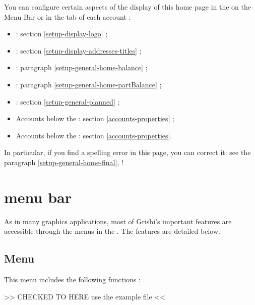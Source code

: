 You can configure certain aspects of the display of this home page in the  on the Menu Bar or in the  tab of each account :
\begin{itemize}
	 \item {} : section \vref{setup-display-logo} ;
	 \item {} : section \vref{setup-display-addresses-titles} ;
	 \item {} : paragraph \vref{setup-general-home-balance} ;
	 \item {} : paragraph \vref{setup-general-home-partBalance} ;
	 \item {} : section \vref{setup-general-planned} ;
	 \item Accounts below the  : section \vref{accounts-properties} ;
	 \item Accounts below the  : section  \vref{accounts-properties}.
\end{itemize}

In particular, if you find a spelling error in this page, you can correct it: see the paragraph \vref{setup-general-home-final},  !

\ifIllustration
\newpage
\fi

\section{menu bar\label{home-menus}}

As in many graphics applications, most of Grisbi's important features are accessible through the menus in the . The features are detailed below.


\subsection{Menu \label{home-menus-file}}

This menu includes the following functions :

>> CHECKED TO HERE  use the example file <<

